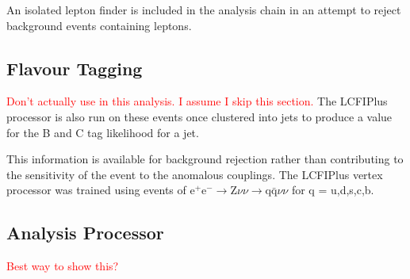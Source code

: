 An isolated lepton finder is included in the analysis chain in an attempt to reject background events containing leptons. 

\subsection{Flavour Tagging} 
\label{sec:flavourtagging}

\textcolor{red}{Don't actually use in this analysis.  I assume I skip this section.}
The LCFIPlus \cite{Suehara:2015ura} processor is also run on these events once clustered into jets to produce a value for the B and C tag likelihood for a jet.  

This information is available for background rejection rather than contributing to the sensitivity of the event to the anomalous couplings. The LCFIPlus vertex processor was trained using events of $\text{e}^{+}\text{e}^{-}\rightarrow \text{Z}\nu\nu \rightarrow \text{q}\bar{\text{q}}\nu\nu$ for q = u,d,s,c,b.

\subsection{Analysis Processor} 
\label{sec:analysisprocessor}
\textcolor{red}{Best way to show this?}

